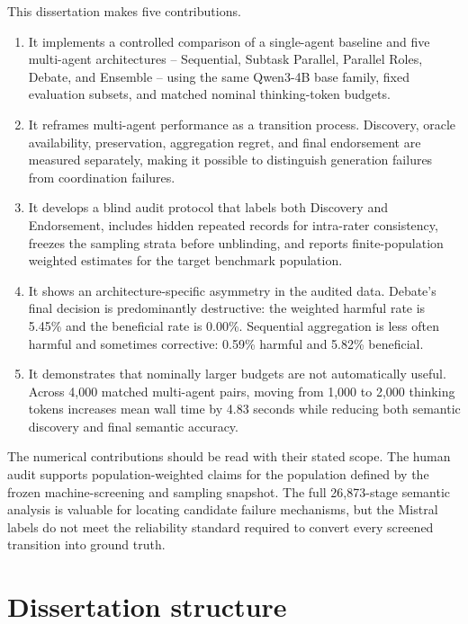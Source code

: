 This dissertation makes five contributions.

\begin{enumerate}[leftmargin=*]
  \item It implements a controlled comparison of a single-agent baseline and five multi-agent architectures -- Sequential, Subtask Parallel, Parallel Roles, Debate, and Ensemble -- using the same Qwen3-4B base family, fixed evaluation subsets, and matched nominal thinking-token budgets.
  \item It reframes multi-agent performance as a transition process. Discovery, oracle availability, preservation, aggregation regret, and final endorsement are measured separately, making it possible to distinguish generation failures from coordination failures.
  \item It develops a blind audit protocol that labels both Discovery and Endorsement, includes hidden repeated records for intra-rater consistency, freezes the sampling strata before unblinding, and reports finite-population weighted estimates for the target benchmark population.
  \item It shows an architecture-specific asymmetry in the audited data. Debate's final decision is predominantly destructive: the weighted harmful \ctow{} rate is 5.45\% and the beneficial \wtoc{} rate is 0.00\%. Sequential aggregation is less often harmful and sometimes corrective: 0.59\% harmful and 5.82\% beneficial.
  \item It demonstrates that nominally larger budgets are not automatically useful. Across 4,000 matched multi-agent pairs, moving from 1,000 to 2,000 thinking tokens increases mean wall time by 4.83 seconds while reducing both semantic discovery and final semantic accuracy.
\end{enumerate}

The numerical contributions should be read with their stated scope. The human audit supports population-weighted claims for the population defined by the frozen machine-screening and sampling snapshot. The full 26,873-stage semantic analysis is valuable for locating candidate failure mechanisms, but the Mistral labels do not meet the reliability standard required to convert every screened transition into ground truth.

\section{Dissertation structure}

